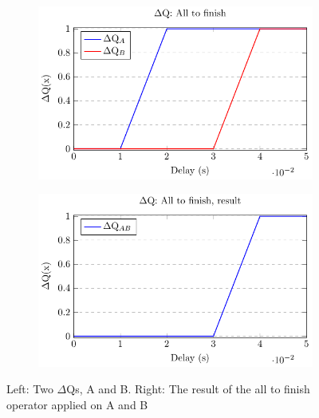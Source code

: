         \begin{figure}[H]
            \centering
            \begin{subfigure}{.5\textwidth}
                \centering
                \includegraphics[scale = 0.7]{tikz/atf_1.pdf}
                \label{fig:sub1}
            \end{subfigure}%
            \begin{subfigure}{.5\textwidth}
                \centering
                \includegraphics[scale = 0.7]{tikz/atf_2.pdf}
                \label{fig:sub2}
            \end{subfigure}
            \caption{Left: Two $\Delta$Qs, A and B. Right: The result of the all to finish operator applied on A and B}%
            \label{fig:test}
            \end{figure}

